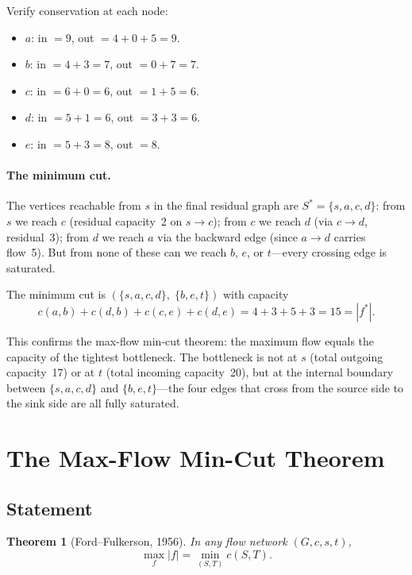 \documentclass[11pt]{article}
\newtheorem{theorem}{Theorem}
\begin{document}
Verify conservation at each node:
\begin{itemize}
  \item $a$: in $= 9$, out $= 4 + 0 + 5 = 9$.
  \item $b$: in $= 4 + 3 = 7$, out $= 0 + 7 = 7$.
  \item $c$: in $= 6 + 0 = 6$, out $= 1 + 5 = 6$.
  \item $d$: in $= 5 + 1 = 6$, out $= 3 + 3 = 6$.
  \item $e$: in $= 5 + 3 = 8$, out $= 8$.
\end{itemize}

\paragraph{The minimum cut.}
The vertices reachable from $s$ in the final residual graph are
$S^* = \{s, a, c, d\}$: from $s$ we reach $c$ (residual
capacity~2 on $s \to c$); from $c$ we reach $d$ (via $c \to d$,
residual~3); from $d$ we reach $a$ via the backward edge
(since $a \to d$ carries flow~5).  But from none of these can we
reach $b$, $e$, or $t$---every crossing edge is saturated.

The minimum cut is
$(\{s, a, c, d\},\; \{b, e, t\})$ with capacity
\[
  c(a, b) + c(d, b) + c(c, e) + c(d, e)
  = 4 + 3 + 5 + 3 = 15 = |f^*|.
\]

This confirms the max-flow min-cut theorem: the maximum flow
equals the capacity of the tightest bottleneck.  The bottleneck
is not at $s$ (total outgoing capacity~17) or at $t$ (total
incoming capacity~20), but at the internal boundary between
$\{s, a, c, d\}$ and $\{b, e, t\}$---the four edges that cross
from the source side to the sink side are all fully saturated.

\section{The Max-Flow Min-Cut Theorem}

\subsection{Statement}

\begin{theorem}[Ford--Fulkerson, 1956]
\label{thm:mfmc}
In any flow network $(G, c, s, t)$,
\[
  \max_f |f| = \min_{(S,T)} c(S,T).
\]
\end{theorem}
\end{document}
